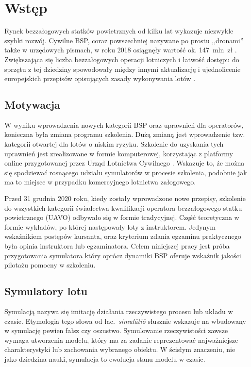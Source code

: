 \newpage
\section{Wstęp}
Rynek bezzałogowych statków powietrznych od kilku lat wykazuje niezwykle szybki rozwój. Cywilne BSP, coraz powszechniej nazywane po prostu ,,dronami'' także w urzędowych pismach, w roku 2018 osiągnęły wartość ok. 147~mln~zł \cite{bialaksiega2019}. Zwiększająca się liczba bezzałogowych operacji lotniczych i łatwość dostępu do sprzętu z tej dziedziny spowodowały między innymi aktualizację i ujednolicenie europejskich przepisów opisujących zasady wykonywania lotów \cite{eu-945-2019}.

\subsection{Motywacja}
W wyniku wprowadzenia nowych kategorii BSP oraz uprawnień dla operatorów, konieczna była zmiana programu szkolenia. Dużą zmianą jest wprowadzenie tzw. kategorii otwartej dla lotów o niskim ryzyku. Szkolenie do uzyskania tych uprawnień jest zrealizowane w formie komputerowej, korzystając z platformy online przygotowanej przez Urząd Lotnictwa Cywilnego \cite{ulc2019}. Wskazuje to, że można się spodziewać rosnącego udziału symulatorów w procesie szkolenia, podobnie jak ma to miejsce w przypadku komercyjnego lotnictwa załogowego.

Przed 31 grudnia 2020 roku, kiedy zostały wprowadzone nowe przepisy, szkolenie do wszystkich kategorii świadectwa kwalifikacji operatora bezzałogowego statku powietrznego (UAVO) odbywało się w formie tradycyjnej. Część teoretyczna w formie wykładów, po której następowały loty z instruktorem. Jedynym wskaźnikiem postępów kursanta, oraz kryterium zdania egzaminu praktycznego była opinia instruktora lub egzaminatora. Celem niniejszej pracy jest próba przygotowania symulatora który oprócz dynamiki BSP oferuje wskaźnik jakości pilotażu pomocny w szkoleniu.

\subsection{Symulatory lotu}
Symulacją nazywa się imitację działania rzeczywistego procesu lub układu w czasie\cite{banks2010}. Etymologia tego słowa od łac.~\emph{simulātiō} słusznie wskazuje na wbudowany w symulację pewien fałsz czy oszustwo. Symulowanie rzeczywistości zawsze wymaga utworzenia modelu, który ma za zadanie reprezentować najważniejsze charakterystyki lub zachowania wybranego obiektu. W ścisłym znaczeniu, nie jako dziedzina nauki, symulacja to ewolucja stanu modelu w czasie\cite{banks2010}.

